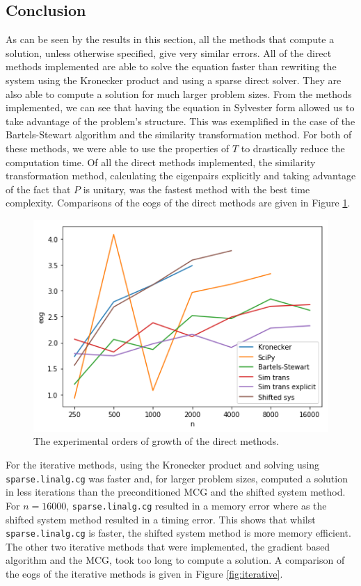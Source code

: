 \documentclass[11pt]{article}
\numberwithin{equation}{section}
\begin{document}
\newpage

\subsection{Conclusion}
As can be seen by the results in this section, all the methods that compute a solution, unless otherwise specified, give very similar errors. All of the direct methods implemented are able to solve the equation faster than rewriting the system using the Kronecker product and using a sparse direct solver. They are also able to compute a solution for much larger problem sizes. From the methods implemented, we can see that having the equation in Sylvester form allowed us to take advantage of the problem's structure. This was exemplified in the case of the Bartels-Stewart algorithm and the similarity transformation method. For both of these methods, we were able to use the properties of $T$ to drastically reduce the computation time. Of all the direct methods implemented, the similarity transformation method, calculating the eigenpairs explicitly and taking advantage of the fact that $P$ is unitary, was the fastest method with the best time complexity. Comparisons of the eogs of the direct methods are given in Figure \ref{fig:direct}.

\begin{figure}[H]
\centering
\includegraphics[scale=.6]{img/direct.png}
\caption{The experimental orders of growth of the direct methods.}
\label{fig:direct}
\end{figure}

For the iterative methods, using the Kronecker product and solving using \texttt{sparse.linalg.cg} was faster and, for larger problem sizes, computed a solution in less iterations than the preconditioned MCG and the shifted system method. For $n=16000$, \texttt{sparse.linalg.cg} resulted in a memory error where as the shifted system method resulted in a timing error. This shows that whilst \texttt{sparse.linalg.cg} is faster, the shifted system method is more memory efficient. The other two iterative methods that were implemented, the gradient based algorithm and the MCG, took too long to compute a solution. A comparison of the eogs of the iterative methods is given in Figure \ref{fig:iterative}.
\end{document}
